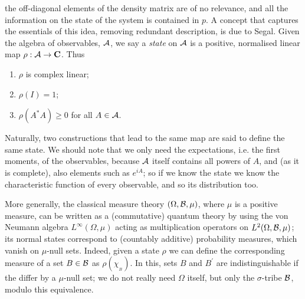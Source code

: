 the off-diagonal elements of the density matrix are of no relevance,
and all the information on the state of the system is contained in $p$.
A concept that captures the essentials of this idea, removing redundant
description, is due to Segal. Given the algebra of observables, ${\cal A}$,
we say a {\em state} on ${\cal A}$ is a positive, normalised linear map
$\rho:{\cal A}\rightarrow{\bf C}$. Thus
\begin{enumerate}
\item $\rho$ is complex linear;
\item $\rho(I)=1$;
\item $\rho(A^*A)\geq0$ for all $A\in{\cal A}$.
\end{enumerate}
Naturally, two constructions that lead to the same map are said to define the
same state. We should note that we only need the expectations, i.e. the first
moments, of the observables, because ${\cal A}$ itself contains all
powers of $A$, and (as it is complete), also elements such as $e^{iA}$; so
if we know the state we know the characteristic function of every
observable, and so its distribution too.

More generally, the classical
measure theory $(\Omega,{\cal B},\mu)$, where $\mu$ is a positive
measure, can be written as a (commutative)
quantum theory by using the von Neumann algebra $L^\infty(\Omega,\mu)$
acting as multiplication operators on $L^2(\Omega,{\cal B},\mu)$;
its normal states correspond to (countably additive) probability
measures, which vanish on $\mu$-null sets. Indeed, given a state $\rho$
we can define the corresponding measure of a set $B\in{\cal B}$ as
$\rho(\chi_{_B})$. In this, sets $B$ and $B^\prime$ are indistinguishable
if the differ by a $\mu$-null set; we do not really need $\Omega$ itself,
but only the $\sigma$-tribe ${\cal B}$, modulo this equivalence.

